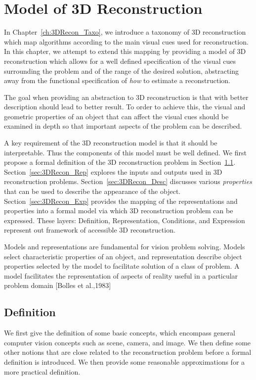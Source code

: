 
\chapter{Model of 3D Reconstruction}
\label{ch:3DRecon_Model}
In Chapter~\ref{ch:3DRecon_Taxo}, we introduce a taxonomy of 3D reconstruction which map algorithms according to the main visual cues used for reconstruction. In this chapter, we attempt to extend this mapping by providing a model of 3D reconstruction which allows for a well defined specification of the visual cues surrounding the problem and of the range of the desired solution, abstracting away from the functional specification of \textit{how} to estimate a reconstruction.

The goal when providing an abstraction to 3D reconstruction is that with better description should lead to better result. To order to achieve this, the visual and geometric properties of an object that can affect the visual cues should be examined in depth so that important aspects of the problem can be described.

A key requirement of the 3D reconstruction model is that it should be interpretable. Thus the components of this model must be well defined. We first propose a formal definition of the 3D reconstruction problem in Section~\ref{sec:3DRecon_Def}. Section~\ref{sec:3DRecon_Rep} explores the inputs and outputs used in 3D reconstruction problems. Section~\ref{sec:3DRecon_Desc} discusses various \textit{properties} that can be used to describe the appearance of the object. Section~\ref{sec:3DRecon_Exp} provides the mapping of the representations and properties into a formal model via which 3D reconstruction problem can be expressed. These layers: Definition, Representation, Conditions, and Expression represent out framework of accessible 3D reconstruction.

Models and representations are fundamental for vision problem solving. Models select characteristic properties of an object, and representation describe object properties selected by the model to facilitate solution of a class of problem. A model facilitates the representation of aspects of reality useful in a particular problem domain [Bolles et al.,1983]

\section{Definition}
\label{sec:3DRecon_Def}
We first give the definition of some basic concepts, which encompass general computer vision concepts such as scene, camera, and image. We then define some other notions that are close related to the reconstruction problem before a formal definition is introduced. We then provide some reasonable approximations for a more practical definition.

